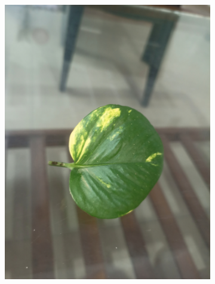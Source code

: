 \documentclass[twocolumn]{article}
\begin{document}
\begin{figure}[H]
\begin{subfigure}[b]{0.30\columnwidth}
        \includegraphics[width=\textwidth]{money2}
    \end{subfigure}
    \hfill
    \begin{subfigure}[b]{0.30\columnwidth}

\end{subfigure}
\end{figure}
\end{document}
